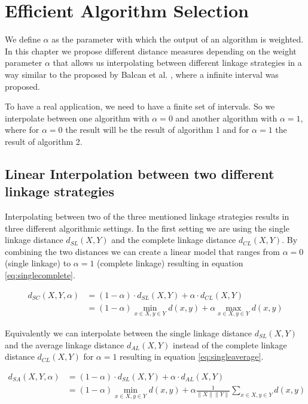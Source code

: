 \chapter{Efficient Algorithm Selection}
\label{chapter:alphalinkage}

We define $\alpha$ as the parameter with which the output of an algorithm is weighted. In this chapter we propose different distance measures depending on the weight parameter $\alpha$ that allows us interpolating between different linkage strategies in a way similar to the proposed by Balcan et al. \cite{DBLP:journals/corr/BalcanNVW16}, where a infinite interval was proposed.

To have a real application, we need to have a finite set of intervals. So we interpolate between one algorithm with $\alpha = 0$ and another algorithm with $\alpha = 1$, where for $\alpha = 0$ the result will be the result of algorithm 1 and for $\alpha = 1$ the result of algorithm 2.

\section{Linear Interpolation between two different linkage strategies}

Interpolating between two of the three mentioned linkage strategies results in three different algorithmic settings. In the first setting we are using the single linkage distance $d_{SL}(X,Y)$ and the complete linkage distance $d_{CL}(X,Y)$. By combining the two distances we can create a linear model that ranges from $\alpha = 0$ (single linkage) to $\alpha = 1$ (complete linkage) resulting in equation \ref{eq:singlecomplete}.

\begin{equation}
    \begin{aligned}
        d_{SC}(X,Y,\alpha) &= (1 - \alpha) \cdot d_{SL}(X,Y) + \alpha \cdot d_{CL}(X,Y)\\
        &= (1 - \alpha) \min\limits_{x \in X, y \in Y} d(x,y) + \alpha \max\limits_{x \in X, y \in Y} d(x,y)
    \end{aligned}
    \label{eq:singlecomplete}
\end{equation}

Equivalently we can interpolate between the single linkage distance $d_{SL}(X,Y)$ and the average linkage distance $d_{AL}(X,Y)$ instead of the complete linkage distance $d_{CL}(X,Y)$ for $\alpha = 1$ resulting in equation \ref{eq:singleaverage}. 

\begin{equation}
    \begin{aligned}
        d_{SA}(X,Y,\alpha) &= (1 - \alpha) \cdot d_{SL}(X,Y) + \alpha \cdot d_{AL}(X,Y)\\
        &= (1 - \alpha) \min\limits_{x \in X, y \in Y} d(x,y) + \alpha \frac{1}{\|X\| \|Y\|}\sum\limits_{x \in X, y \in Y} d(x,y)
    \end{aligned}
    \label{eq:singleaverage}
\end{equation}

